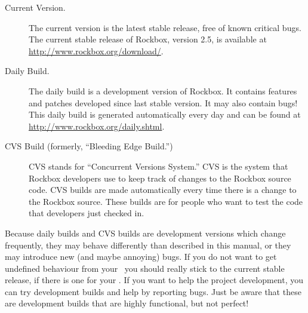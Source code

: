 \begin{description}

\item[Current Version.] The current version is the latest stable release, free 
  of known critical bugs.  The current stable release of Rockbox, version 2.5, 
  is available at \url{http://www.rockbox.org/download/}.
  
\item[Daily Build.] The daily build is a development version of Rockbox. It
  contains features and patches developed since last stable version.  It 
  may also contain bugs! This daily build is generated automatically every day 
  and can be found at \url{http://www.rockbox.org/daily.shtml}.
  
\item[CVS Build (formerly, ``Bleeding Edge Build.'')] CVS stands for 
  ``Concurrent Versions System.'' CVS is the system that Rockbox 
  developers use to keep track of changes to the Rockbox source code. CVS 
  builds are made automatically every time there is a change to the 
  Rockbox source. These builds are for people who want to test the code 
  that developers just checked in. 
  
\end{description}


Because daily builds and CVS builds are development versions which change 
frequently, they may behave differently than described in this manual, or 
they may introduce new (and maybe annoying) bugs. If you do not want to get 
undefined behaviour from your \dap\ you should really stick to the current 
stable release, if there is one for your \dap{}. If you want to help the 
project development, you can try development builds and help by reporting 
bugs. Just be aware that these are development builds that are  highly 
functional, but not perfect!

